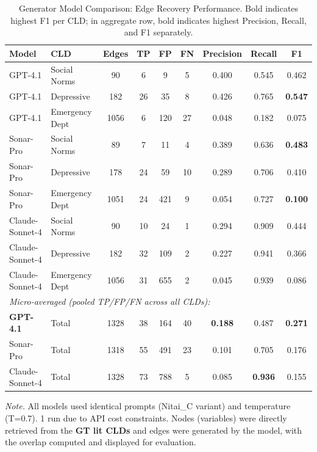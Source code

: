 \begin{table}[H]
\centering
\caption{Generator Model Comparison: Edge Recovery Performance. Bold indicates highest F1 per CLD; in aggregate row, bold indicates highest Precision, Recall, and F1 separately.}
\label{tab:generator_model_comparison}
\begin{threeparttable}
\begin{tabular}{llccccccc}
\toprule
\textbf{Model} & \textbf{CLD} & \textbf{Edges} & \textbf{TP} & \textbf{FP} & \textbf{FN} & \textbf{Precision} & \textbf{Recall} & \textbf{F1} \\
\midrule
GPT-4.1 & Social Norms & 90 & 6 & 9 & 5 & 0.400 & 0.545 & 0.462 \\
GPT-4.1 & Depressive & 182 & 26 & 35 & 8 & 0.426 & 0.765 & \textbf{0.547} \\
GPT-4.1 & Emergency Dept & 1056 & 6 & 120 & 27 & 0.048 & 0.182 & 0.075 \\
\midrule
Sonar-Pro & Social Norms & 89 & 7 & 11 & 4 & 0.389 & 0.636 & \textbf{0.483} \\
Sonar-Pro & Depressive & 178 & 24 & 59 & 10 & 0.289 & 0.706 & 0.410 \\
Sonar-Pro & Emergency Dept & 1051 & 24 & 421 & 9 & 0.054 & 0.727 & \textbf{0.100} \\
\midrule
Claude-Sonnet-4 & Social Norms & 90 & 10 & 24 & 1 & 0.294 & 0.909 & 0.444 \\
Claude-Sonnet-4 & Depressive & 182 & 32 & 109 & 2 & 0.227 & 0.941 & 0.366 \\
Claude-Sonnet-4 & Emergency Dept & 1056 & 31 & 655 & 2 & 0.045 & 0.939 & 0.086 \\
\midrule
\multicolumn{9}{l}{\textit{Micro-averaged (pooled TP/FP/FN across all CLDs):}} \\
\textbf{GPT-4.1} & Total & 1328 & 38 & 164 & 40 & \textbf{0.188} & 0.487 & \textbf{0.271} \\
Sonar-Pro & Total & 1318 & 55 & 491 & 23 & 0.101 & 0.705 & 0.176 \\
Claude-Sonnet-4 & Total & 1328 & 73 & 788 & 5 & 0.085 & \textbf{0.936} & 0.155 \\
\bottomrule
\end{tabular}
\begin{tablenotes}
\small
\item \textit{Note.} All models used identical prompts (Nitai\_C variant) and temperature (T=0.7). 1 run due to API cost constraints. Nodes (variables) were directly retrieved from the \textbf{GT lit CLDs} and edges were generated by the model, with the overlap computed and displayed for evaluation.

\end{tablenotes}
\end{threeparttable}
\end{table}
